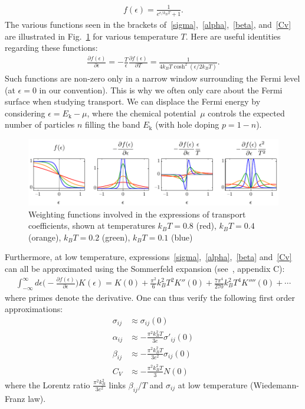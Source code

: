 \documentclass[notitlepage,11pt,nofootinbib]{revtex4-1}
\renewcommand{\vec}[1]{\bm{\mathrm{#1}}}
\begin{document}
\begin{align}
f(\epsilon) = \frac{1}{e^{\epsilon/k_{B}T}+1}.
\end{align}
The various functions seen in the brackets of~\eqref{sigma},~\eqref{alpha},~\eqref{beta}, and~\eqref{Cv} are illustrated in Fig.~\ref{figure_fermi} for various temperature $T$. Here are useful identities regarding these functions:
\begin{align}
\frac{\partial f(\epsilon)}{\partial \epsilon}
= 
-\frac{T}{\epsilon}
\frac{\partial f(\epsilon)}{\partial T} = 
\frac{1}{4k_BT\cosh^{2}(\epsilon/2k_BT)}.
\end{align}
Such functions are non-zero only in a narrow window surrounding the Fermi level (at $\epsilon=0$ in our convention). This is why we often only care about the Fermi surface when studying transport. 
We can displace the Fermi energy by considering $\epsilon = E_{\vec k}-\mu$, where the chemical potential~$\mu$ controls the expected number of particles $n$ filling the band $E_{\vec k}$ (with hole doping $p=1-n$).

\begin{figure}
\centering
\includegraphics[width=\textwidth]{fermi.pdf}
\caption{Weighting functions involved in the expressions of transport coefficients, shown at temperatures $k_BT=0.8$ (red), $k_BT=0.4$ (orange), $k_BT=0.2$ (green), $k_BT=0.1$ (blue)}
\label{figure_fermi}
\end{figure}

Furthermore, at low temperature, expressions~\eqref{sigma},~\eqref{alpha},~\eqref{beta} and~\eqref{Cv} can all be approximated using the Sommerfeld expansion (see~\cite{ashcroft_solid_1976}, appendix C):
\begin{align}
\int_{-\infty}^{\infty} d\epsilon
\bigg(-\frac{\partial f(\epsilon)}{\partial \epsilon}\bigg)
K(\epsilon)
=
K(0)
+
\frac{\pi^2}{6}
k_{B}^2T^2
K''(0)
+
\frac{7\pi^4}{270}
k_{B}^2T^4
K''''(0)
+ \cdots
\end{align}
where primes denote the derivative. One can thus verify the following first order approximations:
\begin{align}
\sigma_{ij}
&\approx
\sigma_{ij}(0)
\label{sigma_expanded}
\\
\alpha_{ij}
&\approx
-\frac{\pi^2k_B^2 T}{3e}\sigma'_{ij}(0)
\label{alpha_expanded}
\\
\beta_{ij}
&\approx
-\frac{\pi^2k_B^2 T}{3e^2}\sigma_{ij}(0)
\label{beta_expanded}
\\
C_V
&\approx
-\frac{\pi^2k_B^2 T}{3}N(0)
\label{Cv_expanded}
\end{align}
where the Lorentz ratio $\frac{\pi^2k_B^2}{3e^2}$ links $\beta_{ij}/T$ and $\sigma_{ij}$ at low temperature (Wiedemann-Franz law).
\end{document}
